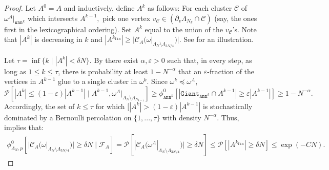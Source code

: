 \documentclass[article,11pt,reqno]{amsart}
\newcommand{\ak}{\mathtt{Ann}^k}
\begin{document}
\begin{appendix}
\begin{proof}
Let $A^0=A$ and inductively, define $A^k$ as follows: For each cluster $\mathcal{C}$ of $\omega^A|_{\mathtt{Ann}^k}$ which intersects $A^{k-1},$ pick one vertex $v_\mathcal{C}\in (\partial_v \Lambda_{N_{k}}\cap \mathcal{C})$ (say, the ones first in the lexicographical ordering). Set $A^k$ equal to the union of the $v_{\mathcal{C}}$'s.  Note that $|A^k|$ is decreasing in $k$ and $|A^{k_{\mathtt{fin}}}|\geq |\mathscr{C}_A(\omega|_{\Lambda_N\setminus \Lambda_{3N/4}})|.$ 
See  for an illustration. 


Let $\tau=\inf\{k\mid |A^k|< \delta N\}$. %
By  there exist $\alpha,\varepsilon>0$ such that, in every step, as long as $1\leq k\leq \tau$, there is probability at least $1-N^{-\alpha}$ that an $\varepsilon$-fraction of the vertices in $A^{k-1}$ glue to a single cluster in $\omega^k$.  Since $\omega^k \preceq \omega^A$, 
\begin{equation} \label{Binomial_Induction}
\mathscr{P}[|A^k|\leq (1-\varepsilon) |A^{k-1}| \mid A^{k-1}, \omega^A|_{\Lambda_N\setminus \Lambda_{N_{k-1}}} ] \geq \phi_{\ak}^0[|\mathtt{Giant}_{\ak}\cap A^{k-1}|\geq  \varepsilon |A^{k-1}| ]\geq 1-N^{-\alpha}.
\end{equation}
Accordingly, the set of $k\leq \tau$ for which $[|A^k|> (1-\varepsilon) |A^{k-1}|$ is stochastically dominated by a Bernoulli percolation on $\{1,...,\tau\}$ with density $N^{-\alpha}.$ Thus,  implies that:
\begin{align*}
\phi_{\Lambda_N,p}^0[|\mathscr{C}_A(\omega|_{\Lambda_N\setminus \Lambda_{3N/4}})|\geq \delta N\mid \mathcal{F}_A]
=\mathscr{P}[|\mathscr{C}_A(\omega^A|_{\Lambda_N\setminus \Lambda_{3N/4}})|\geq \delta N]
\leq \mathscr{P}[|A^{k_{\mathtt{fin}}}|\geq \delta N]
\leq\exp\left(-CN\right).
\end{align*}
\end{proof}

\begin{figure}
    \centering
\usetikzlibrary{calc, backgrounds, decorations.pathreplacing}


\end{figure}
\end{appendix}
\end{document}
